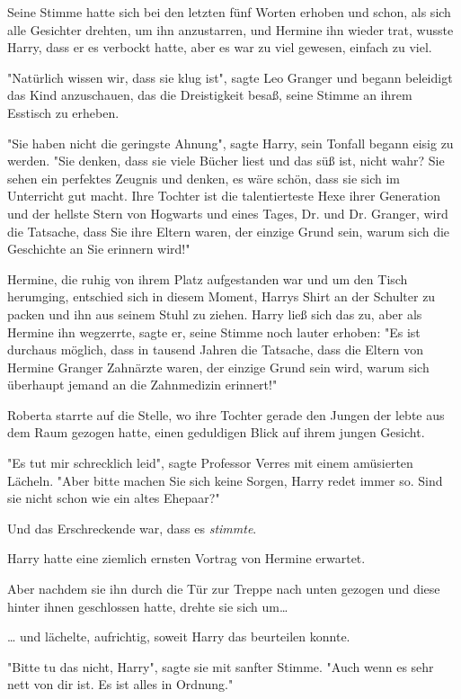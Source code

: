 {Seine Stimme hatte sich bei den letzten fünf Worten erhoben und schon, als sich alle Gesichter drehten, um ihn anzustarren, und Hermine ihn wieder trat, wusste Harry, dass er es verbockt hatte, aber es war zu viel gewesen, einfach zu viel.

"Natürlich wissen wir, dass sie klug ist", sagte Leo Granger und begann beleidigt das Kind anzuschauen, das die Dreistigkeit besaß, seine Stimme an ihrem Esstisch zu erheben.

"Sie haben nicht die geringste Ahnung", sagte Harry, sein Tonfall begann eisig zu werden. "Sie denken, dass sie viele Bücher liest und das süß ist, nicht wahr? Sie sehen ein perfektes Zeugnis und denken, es wäre schön, dass sie sich im Unterricht gut macht. Ihre Tochter ist die talentierteste Hexe ihrer Generation und der hellste Stern von Hogwarts und eines Tages, Dr. und Dr. Granger, wird die Tatsache, dass Sie ihre Eltern waren, der einzige Grund sein, warum sich die Geschichte an Sie erinnern wird!"

Hermine, die ruhig von ihrem Platz aufgestanden war und um den Tisch herumging, entschied sich in diesem Moment, Harrys Shirt an der Schulter zu packen und ihn aus seinem Stuhl zu ziehen. Harry ließ sich das zu, aber als Hermine ihn wegzerrte, sagte er, seine Stimme noch lauter erhoben: "Es ist durchaus möglich, dass in tausend Jahren die Tatsache, dass die Eltern von Hermine Granger Zahnärzte waren, der einzige Grund sein wird, warum sich überhaupt jemand an die Zahnmedizin erinnert!"

Roberta starrte auf die Stelle, wo ihre Tochter gerade den Jungen der lebte aus dem Raum gezogen hatte, einen geduldigen Blick auf ihrem jungen Gesicht.

"Es tut mir schrecklich leid", sagte Professor Verres mit einem amüsierten Lächeln. "Aber bitte machen Sie sich keine Sorgen, Harry redet immer so. Sind sie nicht schon wie ein altes Ehepaar?"

Und das Erschreckende war, dass es \emph{stimmte}.

Harry hatte eine ziemlich ernsten Vortrag von Hermine erwartet.

Aber nachdem sie ihn durch die Tür zur Treppe nach unten gezogen und diese hinter ihnen geschlossen hatte, drehte sie sich um…

… und lächelte, aufrichtig, soweit Harry das beurteilen konnte.

"Bitte tu das nicht, Harry", sagte sie mit sanfter Stimme. "Auch wenn es sehr nett von dir ist. Es ist alles in Ordnung."

}
